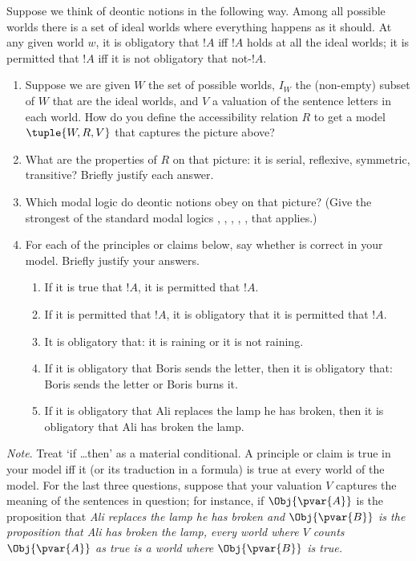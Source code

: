 \documentclass[../../../../include/open-logic-section]{subfiles}
\begin{document}
\begin{prob}
Suppose we think of deontic notions in the following way. Among all
possible worlds there is a set of ideal worlds where everything happens
as it should. At any given world $w$, it is obligatory that $!A$
iff $!A$ holds at all the ideal worlds; it is permitted that $!A$
iff it is not obligatory that not-$!A$. 

\begin{enumerate}
	\item Suppose we are given $W$ the set of possible worlds, $I_{W}$ the
	(non-empty) subset of $W$ that are the ideal worlds, and $V$ a valuation
	of the sentence letters in each world. How do you define the accessibility
	relation $R$ to get a model $\tuple{W,R,V}$ that captures
	the picture above? 
	\item What are the properties of $R$ on that picture: it is serial, reflexive,
	symmetric, transitive? Briefly justify each answer. 
	\item Which modal logic do deontic notions obey on that picture? (Give the
	strongest of the standard modal logics , ,
	, , ,  that applies.) 
	\item For each of the principles or claims below, say whether is correct in
	your model. Briefly justify your answers.
		\begin{enumerate}
			\item If it is true that $!A$, it is permitted that $!A$.
			\item If it is permitted that $!A$, it is obligatory that it is permitted
			that $!A$.
			\item It is obligatory that: it is raining or it is not raining.
			\item If it is obligatory that Boris sends the letter, then it is obligatory
			that: Boris sends the letter or Boris burns it. 
			\item If it is obligatory that Ali replaces the lamp he has broken, then
			it is obligatory that Ali has broken the lamp.
		\end{enumerate}
\end{enumerate}
\emph{Note}. Treat `if \ldots then' as a material conditional. A
principle or claim is true in your model iff it (or its traduction
in a formula) is true at every world of the model. For the last three
questions, suppose that your valuation $V$ captures the meaning of
the sentences in question; for instance, if $\Obj{\pvar{A}}$ is the proposition
that \emph{Ali replaces the lamp he has broken and $\Obj{\pvar{B}}$ is the proposition
that \emph{Ali has broken the lamp}, every world where $V$ counts
$\Obj{\pvar{A}}$ as true is a world where $\Obj{\pvar{B}}$ is true.}


\end{prob}
\end{document}
